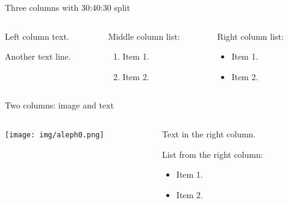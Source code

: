 \documentclass[
  12pt,
  ignorenonframetext,
  aspectratio=169,
  french,
  aspectratio=169]{beamer}
\providecommand{\tightlist}{%
  \setlength{\itemsep}{0pt}\setlength{\parskip}{0pt}}
\begin{document}
\begin{frame}{Three columns with 30:40:30 split}
\label{three-columns-with-304030-split}
\begin{columns}[T]
\begin{column}{0.3\linewidth}
Left column text.

Another text line.
\end{column}

\begin{column}{0.4\linewidth}
Middle column list:

\begin{enumerate}
\tightlist
\item
  Item 1.
\item
  Item 2.
\end{enumerate}
\end{column}

\begin{column}{0.3\linewidth}
Right column list:

\begin{itemize}
\tightlist
\item
  Item 1.
\item
  Item 2.
\end{itemize}
\end{column}
\end{columns}
\end{frame}

\begin{frame}{Two columns: image and text}
\label{two-columns-image-and-text}
\begin{columns}[T]
\begin{column}{0.48\linewidth}
\texttt{[image: img/aleph0.png]}
\end{column}

\begin{column}{0.48\linewidth}
Text in the right column.

List from the right column:

\begin{itemize}
\tightlist
\item
  Item 1.
\item
  Item 2.
\end{itemize}
\end{column}
\end{columns}
\end{frame}
\end{document}
